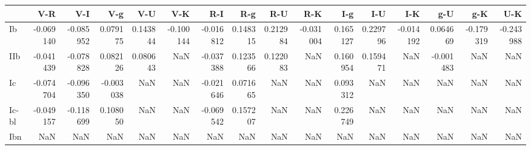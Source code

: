 \begin{tabular}{lrrrrrrrrrrrrrrr}
\toprule
{} &       V-R &       V-I &       V-g &       V-U &       V-K &       R-I &       R-g &       R-U &       R-K &       I-g &       I-U &       I-K &       g-U &       g-K &       U-K \\
\midrule
Ib    & -0.069140 & -0.085952 &  0.079175 &  0.143844 & -0.100144 & -0.016812 &  0.148315 &  0.212984 & -0.031004 &  0.165127 &  0.229796 & -0.014192 &  0.064669 & -0.179319 & -0.243988 \\
IIb   & -0.041439 & -0.078828 &  0.082126 &  0.080643 &       NaN & -0.037388 &  0.123566 &  0.122083 &       NaN &  0.160954 &  0.159471 &       NaN & -0.001483 &       NaN &       NaN \\
Ic    & -0.074704 & -0.096350 & -0.003038 &       NaN &       NaN & -0.021646 &  0.071665 &       NaN &       NaN &  0.093312 &       NaN &       NaN &       NaN &       NaN &       NaN \\
Ic-bl & -0.049157 & -0.118699 &  0.108050 &       NaN &       NaN & -0.069542 &  0.157207 &       NaN &       NaN &  0.226749 &       NaN &       NaN &       NaN &       NaN &       NaN \\
Ibn   &       NaN &       NaN &       NaN &       NaN &       NaN &       NaN &       NaN &       NaN &       NaN &       NaN &       NaN &       NaN &       NaN &       NaN &       NaN \\
\bottomrule
\end{tabular}
